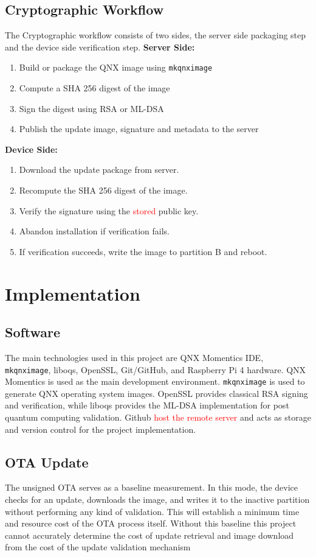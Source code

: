 \documentclass[12pt]{article}
\begin{document}
\subsection{ Cryptographic Workflow}
The Cryptographic workflow consists of two sides, the server side packaging step and the device side verification step.
\textbf{Server Side:}
\begin{enumerate}[leftmargin=2em]
\item Build or package the QNX image using \texttt{mkqnximage}
\item Compute a SHA 256 digest of the image
\item Sign the digest using RSA or ML-DSA
\item Publish the update image, signature and metadata to the server
\end{enumerate}
\textbf{Device Side:}
\begin{enumerate}[leftmargin=2em]
\item Download the update package from server.
\item Recompute the SHA 256 digest of the image.
\item Verify the signature using the \textcolor{red}{stored} public key.
\item Abandon installation if verification fails.
\item If verification succeeds, write the image to partition B and reboot.
\end{enumerate}
\section{Implementation}
\subsection{Software}
The main technologies used in this project are QNX Momentics IDE, \texttt{mkqnximage}, liboqs, OpenSSL, Git/GitHub, and Raspberry Pi 4 hardware. QNX Momentics is used as the main development environment. \texttt{mkqnximage} is used to generate QNX operating system images. OpenSSL provides classical RSA signing and verification, while liboqs provides the ML-DSA implementation for post quantum computing validation. Github \textcolor{red}{host the remote server} and acts as storage and version control for the project implementation. 
\subsection{OTA Update}
The unsigned OTA serves as a baseline measurement. In this mode, the device checks for an update, downloads the image, and writes it to the inactive partition without performing any kind of validation. This will establish a minimum time and resource cost of the OTA process itself. Without this baseline this project cannot accurately determine the cost of update retrieval and image download from the cost of the update validation mechanism 
\end{document}
